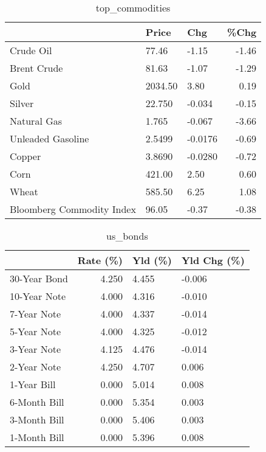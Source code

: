 \documentclass{article}%
\begin{document}
\begin{table}[htbp]%
\caption{top\_commodities}%
\centering%
\begin{adjustbox}{width=1\textwidth}%
\begin{tabular}{lllr}
\toprule
                          &   Price &     Chg &  \%Chg \\
\midrule
               Crude Oil  &   77.46 &   -1.15 & -1.46 \\
             Brent Crude  &   81.63 &   -1.07 & -1.29 \\
                    Gold  & 2034.50 &    3.80 &  0.19 \\
                  Silver  &  22.750 &  -0.034 & -0.15 \\
             Natural Gas  &   1.765 &  -0.067 & -3.66 \\
       Unleaded Gasoline  &  2.5499 & -0.0176 & -0.69 \\
                  Copper  &  3.8690 & -0.0280 & -0.72 \\
                    Corn  &  421.00 &    2.50 &  0.60 \\
                   Wheat  &  585.50 &    6.25 &  1.08 \\
Bloomberg Commodity Index &   96.05 &   -0.37 & -0.38 \\
\bottomrule
\end{tabular}
%
\end{adjustbox}%
\end{table}

%


\begin{table}[htbp]%
\caption{us\_bonds}%
\centering%
\begin{adjustbox}{width=1\textwidth}%
\begin{tabular}{lrll}
\toprule
             &  Rate (\%) & Yld (\%) & Yld Chg (\%) \\
\midrule
30-Year Bond &     4.250 &   4.455 &      -0.006 \\
10-Year Note &     4.000 &   4.316 &      -0.010 \\
 7-Year Note &     4.000 &   4.337 &      -0.014 \\
 5-Year Note &     4.000 &   4.325 &      -0.012 \\
 3-Year Note &     4.125 &   4.476 &      -0.014 \\
 2-Year Note &     4.250 &   4.707 &       0.006 \\
 1-Year Bill &     0.000 &   5.014 &       0.008 \\
6-Month Bill &     0.000 &   5.354 &       0.003 \\
3-Month Bill &     0.000 &   5.406 &       0.003 \\
1-Month Bill &     0.000 &   5.396 &       0.008 \\
\bottomrule
\end{tabular}
%
\end{adjustbox}%
\end{table}
\end{document}
